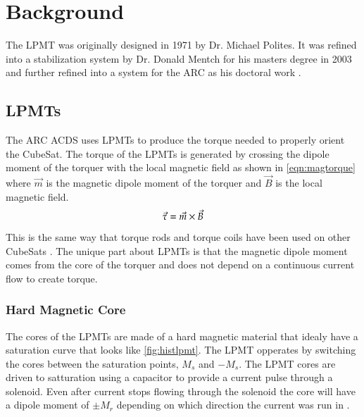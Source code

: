 

\chapter{Background}

\label{ch:BG}


The \ac{LPMT} was originally designed in 1971 by Dr. Michael Polites. It was refined into a stabilization system by Dr. Donald Mentch for his masters degree in 2003 and further refined into a system for the \ac{ARC} as his doctoral work \cite{Mentch11}.

\section{\aclp{LPMT}}

The \ac{ARC} \ac{ACDS} uses \acfp{LPMT} to produce the torque needed to properly orient the CubeSat. The torque of the \acp{LPMT} is generated by crossing the dipole moment of the torquer with the local magnetic field as shown in \autoref{eqn:magtorque} where $\vec{m}$ is the magnetic dipole moment of the torquer and $\vec{B}$ is the local magnetic field.
\begin{equation}
\vec{\tau} = \vec{m} \times \vec{B}
\label{eqn:magtorque}
\end{equation}
This is the same way that torque rods and torque coils have been used on other CubeSats . The unique part about \acp{LPMT} is that the magnetic dipole moment comes from the core of the torquer and does not depend on a continuous current flow to create torque.


\subsection{Hard Magnetic Core}

The cores of the \acp{LPMT} are made of a hard magnetic material that idealy have a saturation curve that looks like \autoref{fig:histlpmt}. The \ac{LPMT} opperates by switching the cores between the saturation points, $M_s$ and $-M_s$. The \ac{LPMT} cores are driven to satturation using a capacitor to provide a current pulse through a solenoid. Even after current stops flowing through the solenoid the core will have a dipole moment of $\pm M_r$ depending on which direction the current was run in \cite{Mentch11}.

